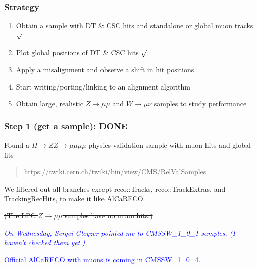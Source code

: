 \documentclass[12pt,compress]{beamer}
\begin{document}
\begin{frame}
\frametitle{Strategy}
\begin{enumerate}\setlength{\itemsep}{0.5 cm}
  \item Obtain a sample with DT \& CSC hits and standalone or global muon tracks \textcolor{red}{$\surd$}
  \item Plot global positions of DT \& CSC hits \textcolor{red}{$\surd$}
  \item Apply a misalignment and observe a shift in hit positions
  \item Start writing/porting/linking to an alignment algorithm
  \item Obtain large, realistic $Z \to \mu\mu$ and $W \to \mu\nu$ samples to study performance
\end{enumerate}
\end{frame}

\begin{frame}
\frametitle{Step 1 (get a sample): DONE}
Found a $H \to ZZ \to \mu\mu\mu\mu$ physics validation sample with muon hits and global fits
\begin{quote}
\rm \scriptsize https://twiki.cern.ch/twiki/bin/view/CMS/RelValSamples
\end{quote}

We filtered out all branches except reco::Tracks, reco::TrackExtras, and
TrackingRecHits, to make it like AlCaRECO.

\vfill
\sout{(The LPC $Z \to \mu\mu$ samples have no muon hits.)}

\it
\textcolor{blue}{On Wednesday, Sergei Gleyzer pointed me to CMSSW\_1\_0\_1 samples. (I haven't checked them yet.)}

\vfill
\textcolor{blue}{Official AlCaRECO with muons is coming in CMSSW\_1\_0\_4.}
\end{frame}
\end{document}
